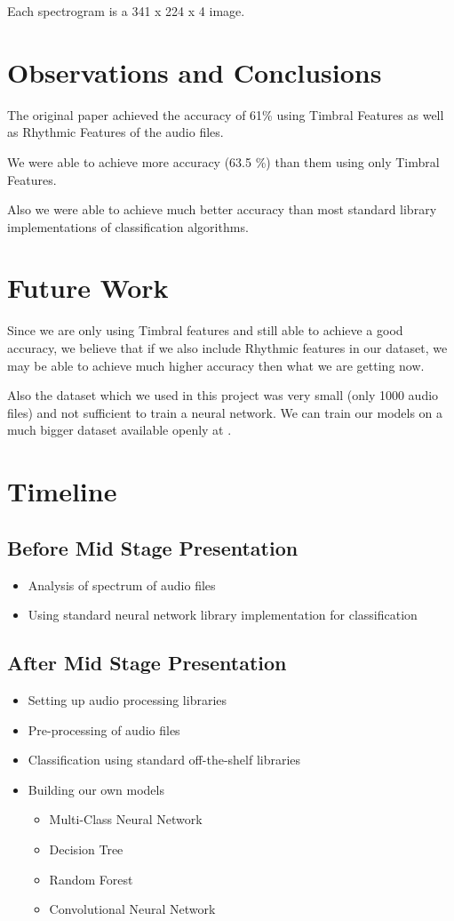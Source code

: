 \documentclass[a4paper,10pt]{article}
\begin{document}
Each spectrogram is a 341 x 224 x 4 image.

\section{Observations and Conclusions}
The original paper \cite{GTZAN} achieved the accuracy of 61\% using Timbral Features as well as Rhythmic Features of the audio files.

We were able to achieve more accuracy (63.5 \%) than them using only Timbral Features.

Also we were able to achieve much better accuracy than most standard library implementations of classification algorithms.

\section{Future Work}
Since we are only using Timbral features and still able to achieve a good accuracy, we believe that if we also include Rhythmic features in our dataset, we may be able to achieve much higher accuracy then what we are getting now.

Also the dataset which we used in this project was very small (only 1000 audio files) and not sufficient to train a neural network. We can train our models on a much bigger dataset available openly at \cite{Bertin-Mahieux2011}.

\section{Timeline}
\subsection{Before Mid Stage Presentation}
\begin{itemize}
 \item Analysis of spectrum of audio files
 \item Using standard neural network library implementation for classification
\end{itemize}
\subsection{After Mid Stage Presentation}
\begin{itemize}
 \item Setting up audio processing libraries
 \item Pre-processing of audio files
 \item Classification using standard off-the-shelf libraries
 \item Building our own models
 \begin{itemize}
  \item Multi-Class Neural Network
  \item Decision Tree
  \item Random Forest
  \item Convolutional Neural Network
 \end{itemize}
\end{itemize}
\end{document}
